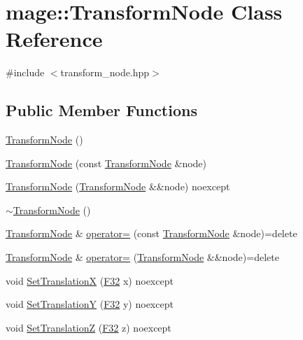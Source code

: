 \hypertarget{classmage_1_1_transform_node}{}\section{mage\+:\+:Transform\+Node Class Reference}
\label{classmage_1_1_transform_node}


{\ttfamily \#include $<$transform\+\_\+node.\+hpp$>$}

\subsection*{Public Member Functions}
\begin{DoxyCompactItemize}
\item 
\hyperlink{classmage_1_1_transform_node_aec41a87ef5f7bca905e1de4b8959350a}{Transform\+Node} ()
\item 
\hyperlink{classmage_1_1_transform_node_a33ae343355c328a543b8665f7f1e9c3f}{Transform\+Node} (const \hyperlink{classmage_1_1_transform_node}{Transform\+Node} \&node)
\item 
\hyperlink{classmage_1_1_transform_node_aff227d1925614bc5afc03c981bc2a717}{Transform\+Node} (\hyperlink{classmage_1_1_transform_node}{Transform\+Node} \&\&node) noexcept
\item 
\hyperlink{classmage_1_1_transform_node_a0c5e84d99c27cda31dae8106611d682f}{$\sim$\+Transform\+Node} ()
\item 
\hyperlink{classmage_1_1_transform_node}{Transform\+Node} \& \hyperlink{classmage_1_1_transform_node_afd5f7d7b377b1a85cbe1d64f8f0df49a}{operator=} (const \hyperlink{classmage_1_1_transform_node}{Transform\+Node} \&node)=delete
\item 
\hyperlink{classmage_1_1_transform_node}{Transform\+Node} \& \hyperlink{classmage_1_1_transform_node_a8dcd5a36ad95917216df628d309b294d}{operator=} (\hyperlink{classmage_1_1_transform_node}{Transform\+Node} \&\&node)=delete
\item 
void \hyperlink{classmage_1_1_transform_node_a68710665ddc9fcba38840bd51c85b3e6}{Set\+TranslationX} (\hyperlink{namespacemage_aa97e833b45f06d60a0a9c4fc22ae02c0}{F32} x) noexcept
\item 
void \hyperlink{classmage_1_1_transform_node_a95f1b55e153664196d76d0664674569e}{Set\+TranslationY} (\hyperlink{namespacemage_aa97e833b45f06d60a0a9c4fc22ae02c0}{F32} y) noexcept
\item 
void \hyperlink{classmage_1_1_transform_node_abfdab39fb0ae4dd14ee7e340fa622693}{Set\+TranslationZ} (\hyperlink{namespacemage_aa97e833b45f06d60a0a9c4fc22ae02c0}{F32} z) noexcept

\end{DoxyCompactItemize}
